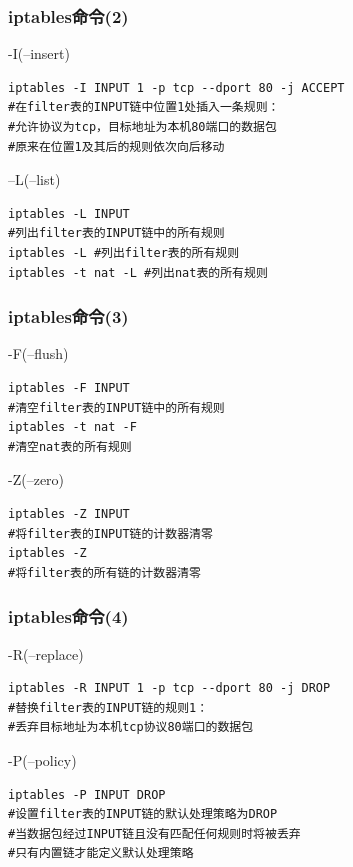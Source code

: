 \documentclass[xcolor=svgnames,presentation]{beamer}
\begin{document}
\begin{frame}[fragile]
\frametitle{iptables命令(2)}
\label{sec-2-15}
\begin{exampleblock}{-I(--insert)}
\label{sec-2-15-1}


\begin{verbatim}
iptables -I INPUT 1 -p tcp --dport 80 -j ACCEPT
#在filter表的INPUT链中位置1处插入一条规则：
#允许协议为tcp，目标地址为本机80端口的数据包
#原来在位置1及其后的规则依次向后移动
\end{verbatim}
\end{exampleblock}
\begin{block}{--L(--list)}
\label{sec-2-15-2}


\begin{verbatim}
iptables -L INPUT
#列出filter表的INPUT链中的所有规则
iptables -L #列出filter表的所有规则
iptables -t nat -L #列出nat表的所有规则
\end{verbatim}
\end{block}
\end{frame}
\begin{frame}[fragile]
\frametitle{iptables命令(3)}
\label{sec-2-16}
\begin{exampleblock}{-F(--flush)}
\label{sec-2-16-1}


\begin{verbatim}
iptables -F INPUT
#清空filter表的INPUT链中的所有规则
iptables -t nat -F
#清空nat表的所有规则
\end{verbatim}
\end{exampleblock}
\begin{block}{-Z(--zero)}
\label{sec-2-16-2}


\begin{verbatim}
iptables -Z INPUT
#将filter表的INPUT链的计数器清零
iptables -Z
#将filter表的所有链的计数器清零
\end{verbatim}
\end{block}
\end{frame}
\begin{frame}[fragile]
\frametitle{iptables命令(4)}
\label{sec-2-17}
\begin{exampleblock}{-R(--replace)}
\label{sec-2-17-1}


\begin{verbatim}
iptables -R INPUT 1 -p tcp --dport 80 -j DROP
#替换filter表的INPUT链的规则1：
#丢弃目标地址为本机tcp协议80端口的数据包
\end{verbatim}
\end{exampleblock}
\begin{block}{-P(--policy)}
\label{sec-2-17-2}


\begin{verbatim}
iptables -P INPUT DROP
#设置filter表的INPUT链的默认处理策略为DROP
#当数据包经过INPUT链且没有匹配任何规则时将被丢弃
#只有内置链才能定义默认处理策略
\end{verbatim}
\end{block}
\end{frame}
\end{document}
